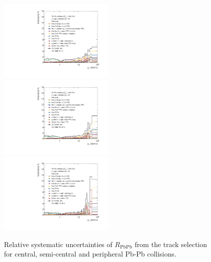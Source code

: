 \documentclass[12pt,a4paper]{report}
\begin{document}
\begin{figure}[H]
\centering
\includegraphics[width=0.495\textwidth]{Plots/SysUncRaacent.pdf}  
\includegraphics[width=0.495\textwidth]{Plots/SysUncRaasemi.pdf}  
\includegraphics[width=0.495\textwidth]{Plots/SysUncRaaperi.pdf}  
\caption{Relative systematic uncertainties of $R_\text{PbPb}$ from the track selection for central, semi-central  and peripheral Pb-Pb collisions.}
\label{SysUncRaa}
\end{figure}
\end{document}
